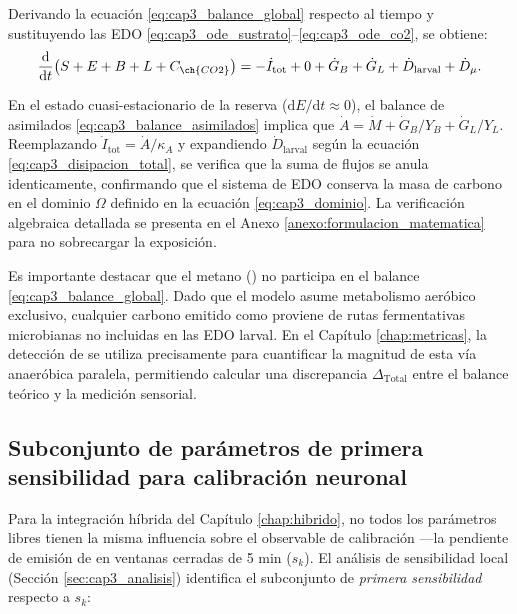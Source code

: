 Derivando la ecuación \eqref{eq:cap3_balance_global} respecto al tiempo y sustituyendo las EDO \eqref{eq:cap3_ode_sustrato}--\eqref{eq:cap3_ode_co2}, se obtiene:
\begin{equation}
    \frac{\mathrm{d}}{\mathrm{d}t}\bigl(S + E + B + L + C_{\ch{CO2}}\bigr) = -\dot{I}_{\mathrm{tot}} + 0 + \dot{G}_B + \dot{G}_L + \dot{D}_{\mathrm{larval}} + \dot{D}_{\mu}.
\end{equation}

En el estado cuasi-estacionario de la reserva ($\mathrm{d}E/\mathrm{d}t \approx 0$), el balance de asimilados \eqref{eq:cap3_balance_asimilados} implica que $\dot{A} = \dot{M} + \dot{G}_B/Y_B + \dot{G}_L/Y_L$. Reemplazando $\dot{I}_{\mathrm{tot}} = \dot{A}/\kappa_A$ y expandiendo $\dot{D}_{\mathrm{larval}}$ según la ecuación \eqref{eq:cap3_disipacion_total}, se verifica que la suma de flujos se anula identicamente, confirmando que el sistema de EDO conserva la masa de carbono en el dominio $\Omega$ definido en la ecuación \eqref{eq:cap3_dominio}. La verificación algebraica detallada se presenta en el Anexo \ref{anexo:formulacion_matematica} para no sobrecargar la exposición.

Es importante destacar que el metano () no participa en el balance \eqref{eq:cap3_balance_global}. Dado que el modelo asume metabolismo aeróbico exclusivo, cualquier carbono emitido como  proviene de rutas fermentativas microbianas no incluidas en las EDO larval. En el Capítulo \ref{chap:metricas}, la detección de  se utiliza precisamente para cuantificar la magnitud de esta vía anaeróbica paralela, permitiendo calcular una discrepancia $\Delta_{\mathrm{Total}}$ entre el balance teórico y la medición sensorial.

\subsection{Subconjunto de parámetros de primera sensibilidad para calibración neuronal}
\label{subsec:cap3_sensibilidad_cap4}

Para la integración híbrida del Capítulo \ref{chap:hibrido}, no todos los parámetros libres tienen la misma influencia sobre el observable de calibración —la pendiente de emisión de  en ventanas cerradas de 5 min ($s_k$). El análisis de sensibilidad local (Sección \ref{sec:cap3_analisis}) identifica el subconjunto de \emph{primera sensibilidad} respecto a $s_k$:

